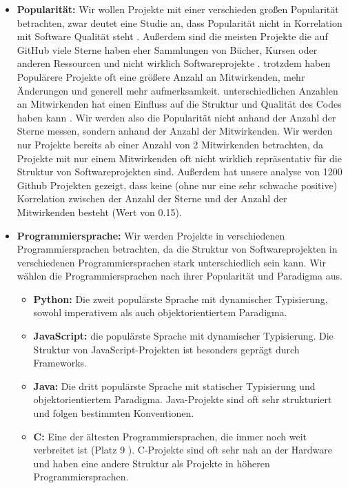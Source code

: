 \begin{itemize}
    \item \textbf{Popularität:} Wir wollen Projekte mit einer verschieden großen Popularität betrachten, zwar deutet eine Studie an, dass Popularität nicht in Korrelation mit Software Qualität steht \cite{popAndQuality}. Außerdem sind die meisten Projekte die auf GitHub viele Sterne haben eher Sammlungen von Bücher, Kursen oder anderen Ressourcen und nicht wirklich Softwareprojekte \cite{evanli/github-ranking_2025}.
    trotzdem haben Populärere Projekte oft eine größere Anzahl an Mitwirkenden, mehr Änderungen und generell mehr aufmerksamkeit. 
    unterschiedlichen Anzahlen an Mitwirkenden hat einen Einfluss auf die Struktur und Qualität des Codes haben kann \cite{numDevs}. Wir werden also die Popularität nicht anhand der Anzahl der Sterne messen, sondern anhand der Anzahl der Mitwirkenden. Wir werden nur Projekte bereits ab einer Anzahl von 2 Mitwirkenden betrachten, da Projekte mit nur einem Mitwirkenden oft nicht wirklich repräsentativ für die Struktur von Softwareprojekten sind. Außerdem hat unsere analyse von 1200 Github Projekten gezeigt, dass keine (ohne nur eine sehr schwache positive) Korrelation zwischen der Anzahl der Sterne und der Anzahl der Mitwirkenden besteht (Wert von 0.15).
    \item \textbf{Programmiersprache:} Wir werden Projekte in verschiedenen Programmiersprachen betrachten, da die Struktur von Softwareprojekten in verschiedenen Programmiersprachen stark unterschiedlich sein kann. Wir wählen die Programmiersprachen nach ihrer Popularität und Paradigma aus. 
    \begin{itemize}
        \item \textbf{Python:} Die zweit populärste Sprache \cite{software_state_2022} mit dynamischer Typisierung, sowohl imperativem als auch objektorientiertem Paradigma. 
        \item \textbf{JavaScript:} die populärste Sprache \cite{software_state_2022} mit dynamischer Typisierung. Die Struktur von JavaScript-Projekten ist besonders geprägt durch Frameworks.
        \item \textbf{Java:} Die dritt populärste Sprache \cite{software_state_2022} mit statischer Typisierung und objektorientiertem Paradigma. Java-Projekte sind oft sehr strukturiert und folgen bestimmten Konventionen.
        \item \textbf{C:} Eine der ältesten Programmiersprachen, die immer noch weit verbreitet ist (Platz 9 \cite{software_state_2022}). C-Projekte sind oft sehr nah an der Hardware und haben eine andere Struktur als Projekte in höheren Programmiersprachen.

\end{itemize}
\end{itemize}
